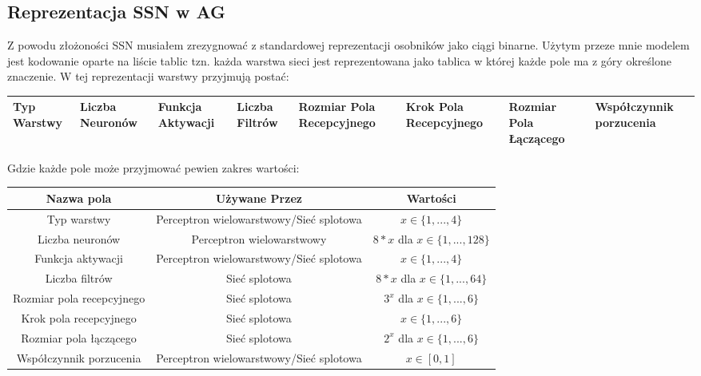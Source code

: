\documentclass{article}
\begin{document}
\subsection{Reprezentacja SSN w AG}
Z powodu złożoności SSN musiałem zrezygnować z standardowej reprezentacji osobników 
jako ciągi binarne. Użytym przeze mnie modelem jest kodowanie oparte na liście tablic tzn.
każda warstwa sieci jest reprezentowana jako tablica w której każde pole ma z góry określone 
znaczenie. W tej reprezentacji warstwy przyjmują postać:

\begin{center}
\begin{tabular}{|p{15mm}|p{15mm}|p{15mm}|p{15mm}|p{15mm}|p{15mm}|p{15mm}|p{15mm}|}
	\hline
	Typ \newline Warstwy & Liczba Neuronów & Funkcja Aktywacji & Liczba Filtrów & Rozmiar Pola Recepcyjnego & Krok Pola Recepcyjnego & Rozmiar Pola Łączącego &  Współczynnik porzucenia \\
	\hline
\end{tabular}
\end{center}
Gdzie każde pole może przyjmować pewien zakres wartości:\\
\begin{center}
\begin{tabular}{|c|c|c|}
	\hline
	Nazwa pola & Używane Przez & Wartości \\
	\hline
	Typ warstwy & Perceptron wielowarstwowy/Sieć splotowa & $x \in \{1, ...,4\}$\\
	Liczba neuronów & Perceptron wielowarstwowy & $8*x$ dla $x\in \{1, ...,128\}$\\
	Funkcja aktywacji & Perceptron wielowarstwowy/Sieć splotowa & $x \in \{1, ...,4\}$\\
	Liczba filtrów & Sieć splotowa & $8*x$ dla $x\in \{1, ...,64\}$\\
	Rozmiar pola recepcyjnego & Sieć splotowa & $3^x$ dla $x \in \{1, ...,6\}$\\
	Krok pola recepcyjnego & Sieć splotowa & $x \in \{1, ...,6\}$\\
	Rozmiar pola łączącego  & Sieć splotowa & $2^x$ dla $x \in \{1, ...,6\}$\\
	Współczynnik porzucenia & Perceptron wielowarstwowy/Sieć splotowa & $x \in [0, 1]$\\
	\hline
\end{tabular}
\end{center}
\end{document}

